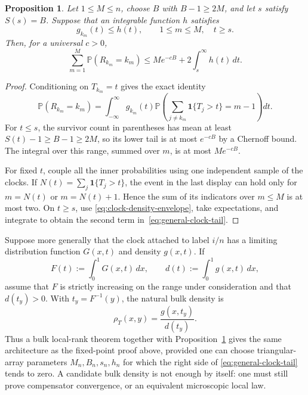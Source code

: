 \documentclass[11pt]{article}
\newtheorem{proposition}[theorem]{Proposition}
\theoremstyle{remark}
\theoremstyle{plain}
\newcommand{\Pp}{\mathbb P}
\newcommand{\one}{\mathbf 1}
\begin{document}
\begin{proposition}
\label{prop:general-clock-tail}
Let $1\le M\le n$, choose $B$ with $B-1\ge2M$, and let $s$ satisfy
$S(s)=B$.  Suppose that an integrable function $h$ satisfies
\begin{equation}\label{eq:clock-density-envelope}
 g_{k_m}(t)\le h(t),\qquad 1\le m\le M,\quad t\ge s.
\end{equation}
Then, for a universal $c>0$,
\begin{equation}\label{eq:general-clock-tail}
 \sum_{m=1}^M\Pp(R_{k_m}=k_m)
 \le M e^{-cB}+2\int_s^\infty h(t)\,dt.
\end{equation}
\end{proposition}

\begin{proof}
Conditioning on $T_{k_m}=t$ gives the exact identity
\[
 \Pp(R_{k_m}=k_m)=\int_{-\infty}^{\infty}g_{k_m}(t)
 \Pp\left(\sum_{j\ne k_m}\one\{T_j>t\}=m-1\right)dt.
\]
For $t\le s$, the survivor count in parentheses has mean at least
$S(t)-1\ge B-1\ge2M$, so its lower tail is at most $e^{-cB}$ by a Chernoff
bound.  The integral over this range, summed over $m$, is at most
$Me^{-cB}$.

For fixed $t$, couple all the inner probabilities using one independent
sample of the clocks.  If $N(t)=\sum_j\one\{T_j>t\}$, the event in the last
display can hold only for $m=N(t)$ or $m=N(t)+1$.  Hence the sum of its
indicators over $m\le M$ is at most two.  On $t\ge s$, use
\eqref{eq:clock-density-envelope}, take expectations, and integrate to obtain
the second term in~\eqref{eq:general-clock-tail}.
\end{proof}

Suppose more generally that the clock attached to label $i/n$ has a limiting
distribution function $G(x,t)$ and density $g(x,t)$.  If
\[
 F(t):=\int_0^1G(x,t)\,dx,\qquad
 d(t):=\int_0^1g(x,t)\,dx,
\]
assume that $F$ is strictly increasing on the range under consideration and
that $d(t_y)>0$.  With $t_y=F^{-1}(y)$, the natural bulk density is
\begin{equation}\label{eq:general-clock-density}
 \rho_T(x,y)=\frac{g(x,t_y)}{d(t_y)}.
\end{equation}
Thus a bulk local-rank theorem together with
Proposition~\ref{prop:general-clock-tail} gives the same architecture as the
fixed-point proof above, provided one can choose triangular-array parameters
$M_n,B_n,s_n,h_n$ for which the right side of
\eqref{eq:general-clock-tail} tends to zero.  A candidate bulk density is not
enough by itself: one must still prove compensator convergence, or an
equivalent microscopic local law.
\end{document}
